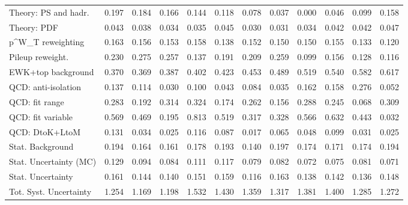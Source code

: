 \begin{tabular}{l|p{0.6cm}p{0.6cm}p{0.6cm}p{0.6cm}p{0.6cm}p{0.6cm}p{0.6cm}p{0.6cm}p{0.6cm}p{0.6cm}p{0.6cm}}
Theory: PS and hadr.                     & 0.197 & 0.184 & 0.166 & 0.144 & 0.118 & 0.078 & 0.037 & 0.000 & 0.046 & 0.099 & 0.158 \\
Theory: PDF                              & 0.043 & 0.038 & 0.034 & 0.035 & 0.045 & 0.030 & 0.031 & 0.034 & 0.042 & 0.042 & 0.047 \\
p^{W}_{T} reweighting                    & 0.163 & 0.156 & 0.153 & 0.158 & 0.138 & 0.152 & 0.150 & 0.150 & 0.155 & 0.133 & 0.120 \\
Pileup reweight.                         & 0.230 & 0.275 & 0.257 & 0.137 & 0.191 & 0.209 & 0.259 & 0.099 & 0.156 & 0.128 & 0.116 \\
EWK+top background                       & 0.370 & 0.369 & 0.387 & 0.402 & 0.423 & 0.453 & 0.489 & 0.519 & 0.540 & 0.582 & 0.617 \\
QCD: anti-isolation                      & 0.137 & 0.114 & 0.030 & 0.100 & 0.043 & 0.084 & 0.035 & 0.162 & 0.158 & 0.276 & 0.052 \\
QCD: fit range                           & 0.283 & 0.192 & 0.314 & 0.324 & 0.174 & 0.262 & 0.156 & 0.288 & 0.245 & 0.068 & 0.309 \\
QCD: fit variable                        & 0.569 & 0.469 & 0.195 & 0.813 & 0.519 & 0.317 & 0.328 & 0.566 & 0.632 & 0.443 & 0.032 \\
QCD: DtoK+LtoM                           & 0.131 & 0.034 & 0.025 & 0.116 & 0.087 & 0.017 & 0.065 & 0.048 & 0.099 & 0.031 & 0.025 \\
Stat. Background                         & 0.194 & 0.164 & 0.161 & 0.178 & 0.193 & 0.140 & 0.197 & 0.174 & 0.171 & 0.174 & 0.194 \\
Stat. Uncertainty (MC)                   & 0.129 & 0.094 & 0.084 & 0.111 & 0.117 & 0.079 & 0.082 & 0.072 & 0.075 & 0.081 & 0.071 \\
\hline
Stat. Uncertainty                        & 0.161 & 0.144 & 0.140 & 0.151 & 0.159 & 0.116 & 0.163 & 0.138 & 0.142 & 0.136 & 0.148 \\
\hline
Tot. Syst. Uncertainty                   & 1.254 & 1.169 & 1.198 & 1.532 & 1.430 & 1.359 & 1.317 & 1.381 & 1.400 & 1.285 & 1.272 \\
\hline
\end{tabular}
